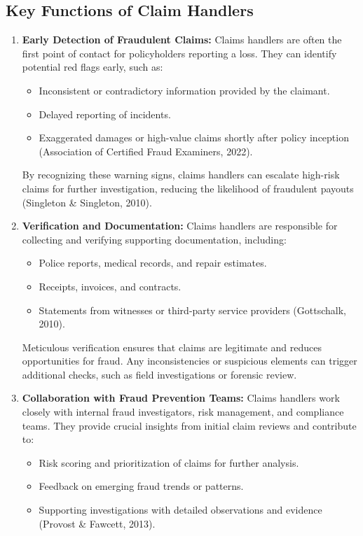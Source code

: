 \documentclass[12pt,a4paper]{article}
\begin{document}
\subsection{Key Functions of Claim Handlers}
\begin{enumerate}
    \item \textbf{Early Detection of Fraudulent Claims:} Claims handlers are often the first point of contact for policyholders reporting a loss. They can identify potential red flags early, such as:
    \begin{itemize}
        \item Inconsistent or contradictory information provided by the claimant.
        \item Delayed reporting of incidents.
        \item Exaggerated damages or high-value claims shortly after policy inception (Association of Certified Fraud Examiners, 2022).
    \end{itemize}
    By recognizing these warning signs, claims handlers can escalate high-risk claims for further investigation, reducing the likelihood of fraudulent payouts (Singleton \& Singleton, 2010).

    \item \textbf{Verification and Documentation:} Claims handlers are responsible for collecting and verifying supporting documentation, including:
    \begin{itemize}
        \item Police reports, medical records, and repair estimates.
        \item Receipts, invoices, and contracts.
        \item Statements from witnesses or third-party service providers (Gottschalk, 2010).
    \end{itemize}
    Meticulous verification ensures that claims are legitimate and reduces opportunities for fraud. Any inconsistencies or suspicious elements can trigger additional checks, such as field investigations or forensic review.

    \item \textbf{Collaboration with Fraud Prevention Teams:} Claims handlers work closely with internal fraud investigators, risk management, and compliance teams. They provide crucial insights from initial claim reviews and contribute to:
    \begin{itemize}
        \item Risk scoring and prioritization of claims for further analysis.
        \item Feedback on emerging fraud trends or patterns.
        \item Supporting investigations with detailed observations and evidence (Provost \& Fawcett, 2013).
    \end{itemize}


\end{enumerate}
\end{document}

